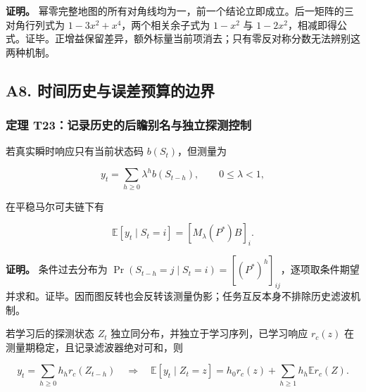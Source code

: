 \documentclass[11pt,a4paper]{article}
\begin{document}
\textbf{证明。}
幂零完整地图的所有对角线均为一，前一个结论立即成立。后一矩阵的三对角行列式为
\(1-3x^2+x^4\)，两个相关余子式为 \(1-x^2\) 与
\(1-2x^2\)，相减即得公式。证毕。正增益保留差异，额外标量当前项消去；只有零反对称分数无法辨别这两种机制。

\subsection{A8.
时间历史与误差预算的边界}\label{a8.-ux65f6ux95f4ux5386ux53f2ux4e0eux8befux5deeux9884ux7b97ux7684ux8fb9ux754c}

\subsubsection{定理
T23：记录历史的后瞻别名与独立探测控制}\label{ux5b9aux7406-t23ux8bb0ux5f55ux5386ux53f2ux7684ux540eux77bbux522bux540dux4e0eux72ecux7acbux63a2ux6d4bux63a7ux5236}

\par
\noindent\begin{minipage}{\linewidth}

若真实瞬时响应只有当前状态码 \(b(S_t)\)，但测量为

\[
y_t=\sum_{h\ge0}\lambda^h b(S_{t-h}),\qquad0\le\lambda<1,
\]

\end{minipage}\par

\par
\noindent\begin{minipage}{\linewidth}

在平稳马尔可夫链下有

\[
\mathbb E[y_t\mid S_t=i]=[M_\lambda(P^*)B]_i.
\]

\end{minipage}\par

\textbf{证明。} 条件过去分布为
\(\Pr(S_{t-h}=j\mid S_t=i)=[(P^*)^h]_{ij}\)，逐项取条件期望并求和。证毕。因而图反转也会反转该测量伪影；任务互反本身不排除历史滤波机制。

\par
\noindent\begin{minipage}{\linewidth}

若学习后的探测状态 \(Z_t\) 独立同分布，并独立于学习序列，已学习响应
\(r_c(z)\) 在测量期稳定，且记录滤波器绝对可和，则

\[
y_t=\sum_{h\ge0}h_h r_c(Z_{t-h})
\quad\Longrightarrow\quad
\mathbb E[y_t\mid Z_t=z]
=h_0r_c(z)+\sum_{h\ge1}h_h\mathbb E r_c(Z).
\]

\end{minipage}\par
\end{document}
